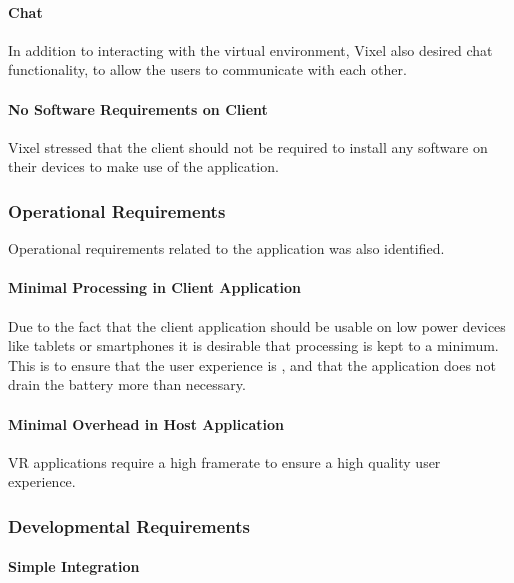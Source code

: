 \paragraph{Chat}
In addition to interacting with the virtual environment, Vixel also desired chat functionality, to allow the users to communicate with each other.

\paragraph{No Software Requirements on Client}
Vixel stressed that the client should not be required to install any software on their devices to make use of the application. 

\subsubsection{Operational Requirements}
Operational requirements related to the application was also identified.

\paragraph{Minimal Processing in Client Application}
Due to the fact that the client application should be usable on low power devices like tablets or smartphones it is desirable that processing is kept to a minimum. This is to ensure that the user experience is , and that the application does not drain the battery more than necessary.

\paragraph{Minimal Overhead in Host Application}
VR applications require a high framerate to ensure a high quality user experience.

\subsubsection{Developmental Requirements}
\paragraph{Simple Integration}

